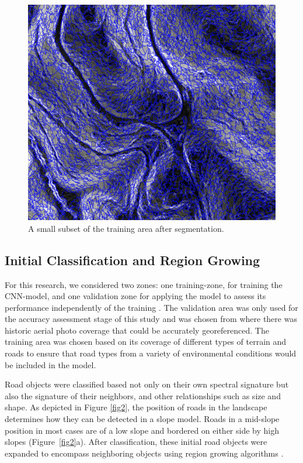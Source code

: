 \documentclass[remotesensing,article,accept,pdftex,moreauthors]{Definitions/mdpi}
\begin{document}
\begin{figure}[H]
\includegraphics[width=10.5 cm]{segment.png}
\caption{A small subset of the training area after segmentation.  \label{fig4}}
\end{figure}   


\subsection{Initial Classification and Region Growing}


For this research, we considered two zones: one training-zone, for training the CNN-model, and one validation zone for applying the model to assess its performance independently of the training \cite{navulur, prakash}. The validation area was only used for the accuracy assessment stage of this study and was chosen from where there was historic aerial photo coverage that could be accurately georeferenced. The training area was chosen based on its coverage of different types of terrain and roads to ensure that road types from a variety of environmental conditions would be included in the model.

Road objects were classified based not only on their own spectral signature but also the signature of their neighbors, and other relationships such as size and shape. As depicted in Figure \ref{fig2}, the position of roads in the landscape determines how they can be detected in a slope model. Roads in a mid-slope position in most cases are of a low slope and bordered on either side by high slopes (Figure~\ref{fig2}a). After classification, these initial road objects were expanded to encompass neighboring objects using region growing algorithms %
.
\end{document}
